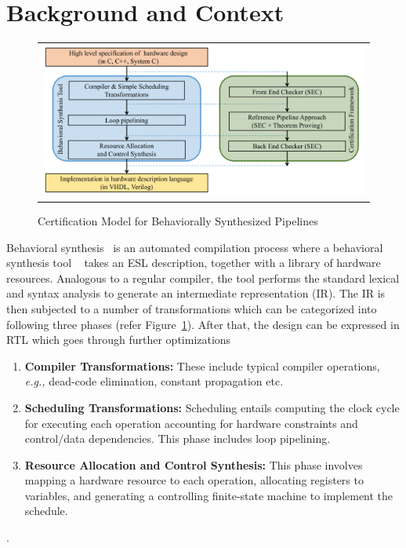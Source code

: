 \section{Background and Context}
\label{sec:background}

\begin{figure}
\begin{center}
\begin{tabular}{c}
\includegraphics[height=2in]{fig-proposal/certification-framework}
\end{tabular}
\end{center}
\caption{Certification Model for Behaviorally Synthesized Pipelines}
\label{fig:certification-framework}
\end{figure}

Behavioral synthesis~\cite{lin:survey-97} is an automated compilation process where a behavioral synthesis tool ~\cite{spark,xpilot,legup}  takes an ESL description, together with a library of hardware resources. Analogous to a regular compiler,
the tool performs the standard lexical and syntax analysis to generate an intermediate representation (IR). The IR is then subjected to a number of
transformations which can be categorized into following three phases (refer Figure~\ref{fig:certification-framework}). After that, the design can be expressed in
RTL which goes through further optimizations

 \begin{enumerate}
\item {\bf Compiler Transformations:} These include typical
  compiler operations, {\em e.g.,} dead-code elimination,
  constant propagation etc. 
\item {\bf Scheduling Transformations:} Scheduling entails
  computing the clock cycle for executing each operation 
  accounting for hardware constraints
  and control/data dependencies.  This phase includes loop pipelining.
\item {\bf Resource Allocation and Control Synthesis:} This phase
  involves mapping a hardware resource to each operation, allocating
  registers to variables, and generating a controlling finite-state
  machine to implement the schedule.
\end{enumerate}. 

